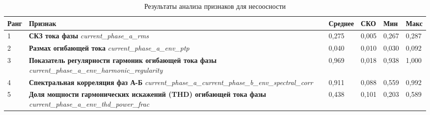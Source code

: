 \begin{table}[htbp]
\centering
\caption{Результаты анализа признаков для несоосности}
\label{tab:misalignment_features}
\begin{tabular}{p{1cm} p{6cm} p{1.5cm} p{1.5cm} p{1.5cm} p{1.5cm}}
\toprule
\textbf{Ранг} & 
\textbf{Признак} &
\textbf{Среднее} & 
\textbf{СКО} &
\textbf{Мин} &
\textbf{Макс} \\
\midrule

1 & 
\textbf{СКЗ тока фазы} \newline
\textit{current\_phase\_a\_rms} & 
0,275 & 0,005 & 0,267 & 0,287 \\
\midrule

2 & 
\textbf{Размах огибающей тока} \newline
\textit{current\_phase\_a\_env\_ptp} & 
0,040 & 0,010 & 0,030 & 0,092 \\
\midrule

3 & 
\textbf{Показатель регулярности гармоник огибающей тока фазы} \newline
\textit{current\_phase\_a\_env\_harmonic\_regularity} & 
0,969 & 0,018 & 0,938 & 1,000 \\
\midrule

4 & 
\textbf{Спектральная корреляция фаз А-Б} \newline
\textit{current\_phase\_a\_current\_phase\_b\_env\_spectral\_corr} & 
0,911 & 0,088 & 0,559 & 0,992 \\
\midrule

5 & 
\textbf{Доля мощности гармонических искажений (THD) огибающей тока фазы} \newline
\textit{current\_phase\_a\_env\_thd\_power\_frac} & 
0,438 & 0,101 & 0,203 & 0,589 \\

\bottomrule
\end{tabular}
\end{table}

